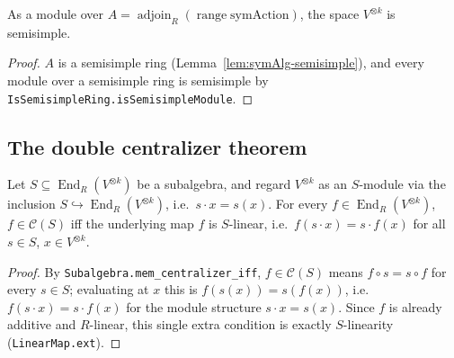 \begin{lemma}
    \label{lem:module-semisimple}
    \leanok
    As a module over $A = \operatorname{adjoin}_R(\operatorname{range}\mathrm{symAction})$, the space
    $V^{\otimes k}$ is semisimple.
\end{lemma}
\begin{proof}
    $A$ is a semisimple ring (Lemma~\ref{lem:symAlg-semisimple}), and every module over a
    semisimple ring is semisimple by \texttt{IsSemisimpleRing.isSemisimpleModule}.
\end{proof}

\subsection{The double centralizer theorem}

\begin{lemma}
    \label{lem:mem-centralizer-iff-linear}
    \leanok
    Let $S \subseteq \operatorname{End}_R(V^{\otimes k})$ be a subalgebra, and regard $V^{\otimes k}$ as
    an $S$-module via the inclusion $S \hookrightarrow \operatorname{End}_R(V^{\otimes k})$, i.e.\
    $s \cdot x = s(x)$. For every $f \in \operatorname{End}_R(V^{\otimes k})$, $f \in \mathcal{C}(S)$ iff
    the underlying map $f$ is $S$-linear, i.e.\ $f(s \cdot x) = s \cdot f(x)$ for all $s \in S$,
    $x \in V^{\otimes k}$.
\end{lemma}
\begin{proof}
    By \texttt{Subalgebra.mem\_centralizer\_iff}, $f \in \mathcal{C}(S)$ means $f \circ s = s \circ f$ for
    every $s \in S$; evaluating at $x$ this is $f(s(x)) = s(f(x))$, i.e.\ $f(s \cdot x) = s \cdot f(x)$ for
    the module structure $s \cdot x = s(x)$. Since $f$ is already additive and $R$-linear, this single
    extra condition is exactly $S$-linearity (\texttt{LinearMap.ext}).
\end{proof}

